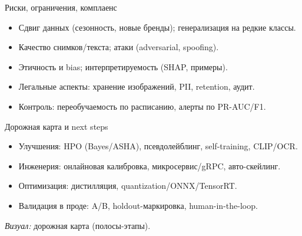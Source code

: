 \documentclass[aspectratio=169,10pt]{beamer}
\begin{document}
\begin{frame}{Риски, ограничения, комплаенс}
\begin{itemize}
  \item Сдвиг данных (сезонность, новые бренды); генерализация на редкие классы.
  \item Качество снимков/текста; атаки (adversarial, spoofing).
  \item Этичность и bias; интерпретируемость (SHAP, примеры).
  \item Легальные аспекты: хранение изображений, PII, retention, аудит.
  \item Контроль: переобучаемость по расписанию, алерты по PR-AUC/F1.
\end{itemize}
\medskip
\end{frame}

\begin{frame}{Дорожная карта и next steps}
\begin{itemize}
  \item Улучшения: HPO (Bayes/ASHA), псевдолейблинг, self-training, CLIP/OCR.
  \item Инженерия: онлайновая калибровка, микросервис/gRPC, авто-скейлинг.
  \item Оптимизация: дистилляция, quantization/ONNX/TensorRT.
  \item Валидация в проде: A/B, holdout-маркировка, human-in-the-loop.
\end{itemize}
\medskip
\textit{Визуал:} дорожная карта (полосы-этапы).
\end{frame}

\end{document}

